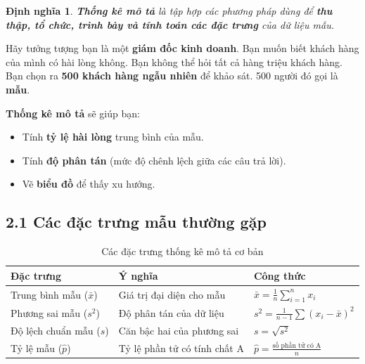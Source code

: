 \documentclass[a4paper,12pt]{article}
\newtheorem{defn}{\color{defcolor}\bfseries Định nghĩa}[section]
\theoremstyle{remark}
\begin{document}
\begin{defn}
\textbf{Thống kê mô tả} là tập hợp các phương pháp dùng để \textbf{thu thập, tổ chức, trình bày và tính toán các đặc trưng} của dữ liệu mẫu.
\end{defn}

\begin{metabox}
Hãy tưởng tượng bạn là một \textbf{giám đốc kinh doanh}. Bạn muốn biết khách hàng của mình có hài lòng không. Bạn không thể hỏi tất cả hàng triệu khách hàng. Bạn chọn ra \textbf{500 khách hàng ngẫu nhiên} để khảo sát. 500 người đó gọi là \textbf{mẫu}.

\textbf{Thống kê mô tả} sẽ giúp bạn:
\begin{itemize}
    \item Tính \textbf{tỷ lệ hài lòng} trung bình của mẫu.
    \item Tính \textbf{độ phân tán} (mức độ chênh lệch giữa các câu trả lời).
    \item Vẽ \textbf{biểu đồ} để thấy xu hướng.
\end{itemize}
\end{metabox}

\subsection*{2.1 Các đặc trưng mẫu thường gặp}

\begin{table}[H]
\centering
\caption{Các đặc trưng thống kê mô tả cơ bản}
\begin{tabular}{@{}p{4cm} p{5cm} p{3cm}@{}}
\toprule
\textbf{Đặc trưng} & \textbf{Ý nghĩa} & \textbf{Công thức} \\
\midrule
Trung bình mẫu (\(\bar{x}\)) & Giá trị đại diện cho mẫu & \(\displaystyle \bar{x} = \frac{1}{n}\sum_{i=1}^n x_i\) \\
Phương sai mẫu (\(s^2\)) & Độ phân tán của dữ liệu & \(\displaystyle s^2 = \frac{1}{n-1}\sum (x_i - \bar{x})^2\) \\
Độ lệch chuẩn mẫu (\(s\)) & Căn bậc hai của phương sai & \(s = \sqrt{s^2}\) \\
Tỷ lệ mẫu (\(\hat{p}\)) & Tỷ lệ phần tử có tính chất A & \(\displaystyle \hat{p} = \frac{\text{số phần tử có A}}{n}\) \\
\bottomrule
\end{tabular}
\end{table}
\end{document}
